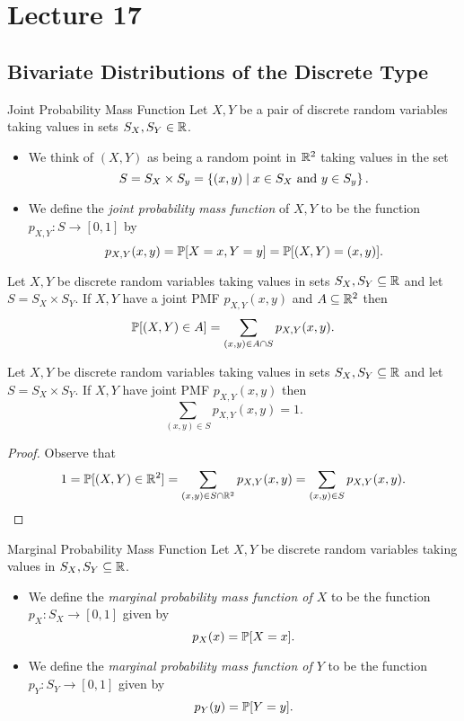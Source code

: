 \documentclass[class=article, crop=false]{standalone}
\begin{document}
  \section{Lecture 17}
  \subsection{Bivariate Distributions of the Discrete Type}
  \begin{definition}{Joint Probability Mass Function}
    Let $X, Y$ be a pair of discrete random variables taking values in sets $S_X, S_Y\in\R$.
    \begin{itemize}
      \item We think of $(X, Y)$ as being a random point in $\R^2$ taking values in the set
      \[
        S = S_X\times S_y = \set{(x, y)\mid x\in S_X\text{ and }y\in S_y}.
      \]
      \item We define the \emph{joint probability mass function} of $X, Y$ to be the function $p_{X, Y}\colon S\to [0, 1]$ by
      \[
        p_{X, Y}(x, y) = \P[X = x, Y = y] = \P[(X, Y) = (x, y)].
      \]
    \end{itemize}
  \end{definition}
  \begin{theorem}{}
    Let $X, Y$ be discrete random variables taking values in sets $S_X, S_Y\sse\R$ and let $S = S_X\times S_Y$. If $X, Y$ have a joint PMF $p_{X, Y}(x, y)$ and $A\sse\R^2$ then
    \[
      \P[(X, Y)\in A] = \sum_{(x, y)\in A\cap S}p_{X, Y}(x, y).
    \]
  \end{theorem}
  \begin{theorem}{}
    Let $X, Y$ be discrete random variables taking values in sets $S_X, S_Y\sse\R$ and let $S = S_X\times S_Y$. If $X, Y$ have joint PMF $p_{X, Y}(x, y)$ then
    \[
      \sum_{(x, y)\in S}p_{X, Y}(x, y) = 1.
    \]
    \begin{proof}
      Observe that
      \[
        1 = \P[(X, Y)\in\R^2] = \sum_{(x, y)\in S\cap \R^2} p_{X, Y}(x, y) = \sum_{(x, y)\in S}p_{X, Y}(x, y).
      \]
    \end{proof}
  \end{theorem}
  \begin{definition}{Marginal Probability Mass Function}
    Let $X, Y$ be discrete random variables taking values in $S_X, S_Y\sse\R$.
    \begin{itemize}
      \item We define the \emph{marginal probability mass function of $X$} to be the function $p_X\colon S_X\to [0, 1]$ given by
      \[
        p_X(x) = \P[X = x].
      \]
      \item We define the \emph{marginal probability mass function of $Y$} to be the function $p_Y\colon S_Y\to [0, 1]$ given by
      \[
        p_Y(y) = \P[Y = y].
      \]
    \end{itemize}
  \end{definition}
\end{document}
